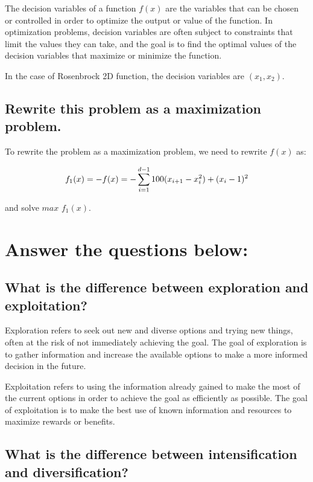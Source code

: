 \documentclass[conference]{IEEEtran}
\begin{document}
The decision variables of a function $f(x)$ are the variables that can be chosen or controlled in order to optimize the output or value of the function. In optimization problems, decision variables are often subject to constraints that limit the values they can take, and the goal is to find the optimal values of the decision variables that maximize or minimize the function.

In the case of Rosenbrock 2D function, the decision variables are $(x_1, x_2)$.

\subsection{Rewrite this problem as a maximization problem.}

To rewrite the problem as a maximization problem, we need to rewrite $f(x)$ as:

\begin{equation}
	f_1(x) = -f(x) = -\sum_{i=1}^{d-1} 100 (x_{i+1} - x_i^2) + (x_i - 1)^2\\	
\end{equation}

and solve $max$ $f_1(x)$.

\section{Answer the questions below: }

\subsection{What is the difference between exploration and exploitation?}

Exploration refers to seek out new and diverse options and trying new things, often at the risk of not immediately achieving the goal. The goal of exploration is to gather information and increase the available options to make a more informed decision in the future.

Exploitation refers to using the information already gained to make the most of the current options in order to achieve the goal as efficiently as possible. The goal of exploitation is to make the best use of known information and resources to maximize rewards or benefits.

\subsection{What is the difference between intensification and diversification?}
\end{document}
